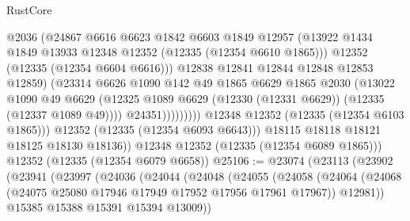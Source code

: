\begin{lexlean}{RustCore}
\begin{coremodule}
                                @2036
                                (@24867
                                  @6616
                                  @6623
                                  @1842
                                  @6603
                                  @1849
                                  @12957
                                  (@13922
                                    @1434
                                    @1849
                                    @13933
                                    @12348
                                    @12352
                                    (@12335 (@12354 @6610 @1865)))
                                  @12352
                                  (@12335 (@12354 @6604 @6616)))
                                @12838
                                @12841
                                @12844
                                @12848
                                @12853
                                @12859)
                              (@23314
                                @6626
                                @1090
                                @142
                                @49
                                @1865
                                @6629
                                @1865
                                @2030
                                (@13022
                                  @1090
                                  @49
                                  @6629
                                  (@12325
                                    @1089
                                    @6629
                                    (@12330 (@12331 @6629))
                                    (@12335 (@12337 @1089 @49))))
                                @24351)))))))))
              @12348
              @12352
              (@12335 (@12354 @6103 @1865)))
            @12352
            (@12335 (@12354 @6093 @6643)))
          @18115
          @18118
          @18121
          @18125
          @18130
          @18136))
      @12348
      @12352
      (@12335 (@12354 @6089 @1865)))
    @12352
    (@12335 (@12354 @6079 @6658))
@25106 := @23074
    (@23113
      (@23902
        (@23941
          (@23997
            (@24036
              (@24044
                (@24048
                  (@24055
                    (@24058
                      (@24064
                        (@24068 (@24075 @25080 @17946 @17949 @17952 @17956 @17961 @17967))
                        @12981))
                    @15385
                    @15388
                    @15391
                    @15394
                    @13009))

\end{coremodule}
\end{lexlean}
